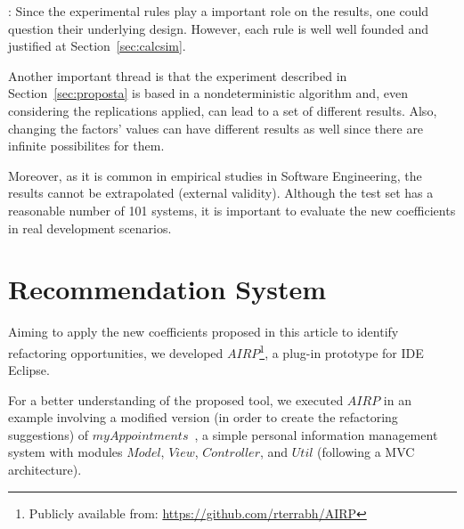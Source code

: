 \documentclass[smallextended,natbib]{svjour3}
\begin{document}
{%

: Since the experimental rules play a important role on the results, one could question their underlying design. However, each rule is well well founded and justified at Section~\ref{sec:calcsim}.%

Another important thread is that the experiment described in Section~\ref{sec:proposta} is based in a nondeterministic algorithm and, even considering the replications applied, can lead to a set of different results. Also, changing the factors' values can have different results as well since there are infinite possibilites for them.

Moreover, as it is common in empirical studies in Software Engineering, the results cannot be extrapolated (external validity). Although the test set has a reasonable number of 101 systems, it is important to evaluate the new coefficients in real development scenarios.

\section{Recommendation System}
\label{sec:sistema}

Aiming to apply the new coefficients proposed in this article to identify refactoring opportunities, we developed $AIRP$\footnote{Publicly available from: \url{https://github.com/rterrabh/AIRP}}, a plug-in prototype for IDE Eclipse. %

For a better understanding of the proposed tool, we executed $AIRP$ in an example involving a modified version (in order to create the refactoring suggestions) of $myAppointments$~\citep{leoterr}, a simple personal information management system with modules $Model$, $View$, $Controller$, and $Util$ (following a MVC architecture).

}
\end{document}
